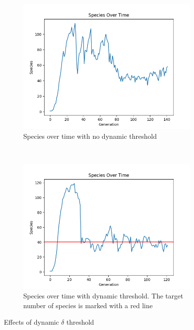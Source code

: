 \documentclass[twocolumn,letterpaper]{article}
\begin{document}
\begin{figure}[h]
	\centering
	\begin{subfigure}[b]{0.3\textwidth}
		\includegraphics[width=\textwidth]{images/no_adjust.png}
		\caption{Species over time with no dynamic threshold}
		\label{fig:no_adjust}
	\end{subfigure}
	~
	\begin{subfigure}[b]{0.3\textwidth}
		\includegraphics[width=\textwidth]{images/with_adjust.png}
		\caption{Species over time with dynamic threshold. The target number of species is marked with a red line}
		\label{fig:with_adjust}
	\end{subfigure}
	\caption{Effects of dynamic $\delta$ threshold}
	\label{fig:speciation_adjustment}
\end{figure}
\end{document}
